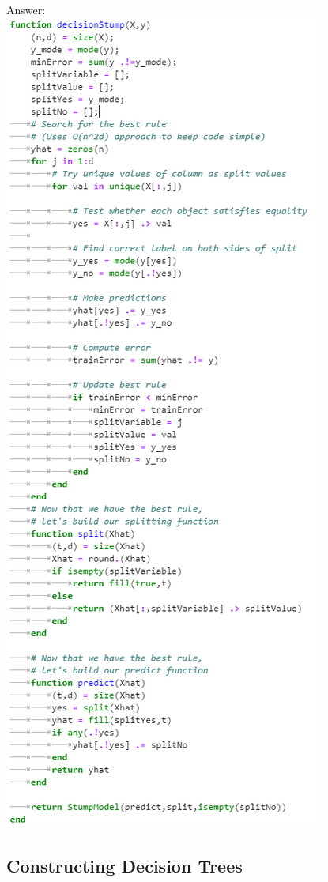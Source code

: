\documentclass{article}
\def\ans#1{\par\gre{Answer: #1}}
\def\gre#1{{\color{gre}#1}}
\begin{document}
\ans{\\ 
\includegraphics{DecStump.PNG}
}
\subsection{Constructing Decision Trees}
\end{document}
